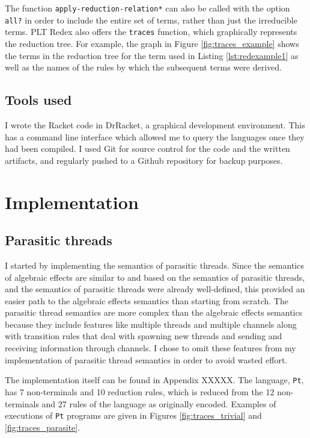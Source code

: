 \documentclass[12pt,a4paper,twoside,openright]{report}
\begin{document}
The function \texttt{apply-reduction-relation*} can also be called with the option \texttt{all?} in order to include the entire set of terms, rather than just the irreducible terms. PLT Redex also offers the \texttt{traces} function, which graphically represents the reduction tree. For example, the graph in Figure \ref{fig:traces_example} shows the terms in the reduction tree for the term used in Listing \ref{lst:redexample1} as well as the names of the rules by which the subsequent terms were derived.

\section{Tools used}

I wrote the Racket code in DrRacket, a graphical development environment. This has a command line interface which allowed me to query the languages once they had been compiled. I used Git for source control for the code and the written artifacts, and regularly pushed to a Github repository for backup purposes.

\chapter{Implementation}

\section{Parasitic threads}

I started by implementing the semantics of parasitic threads. Since the semantics of algebraic effects are similar to and based on the semantics of parasitic threads, and the semantics of parasitic threads were already well-defined,\cite{Siv2014} this provided an easier path to the algebraic effects semantics than starting from scratch. The parasitic thread semantics are more complex than the algebraic effects semantics because they include features like multiple threads and multiple channels along with transition rules that deal with spawning new threads and sending and receiving information through channels. I chose to omit these features from my implementation of parasitic thread semantics in order to avoid wasted effort.

The implementation itself can be found in Appendix XXXXX. The language, \texttt{Pt}, has 7 non-terminals and 10 reduction rules, which is reduced from the 12 non-terminals and 27 rules of the language as originally encoded. Examples of executions of \texttt{Pt} programs are given in Figures \ref{fig:traces_trivial} and \ref{fig:traces_parasite}. 
\end{document}
